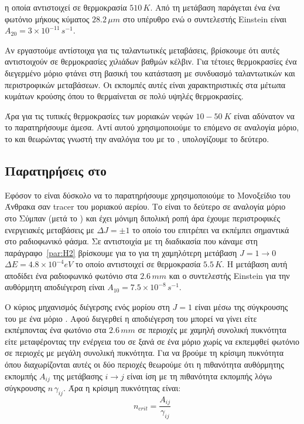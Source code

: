 \documentclass[a4paper,12pt]{memoir}
\begin{document}
η οποία αντιστοιχεί σε θερμοκρασία $510 \,K$. Από τη μετάβαση παράγεται ένα ένα φωτόνιο μήκους κύματος $28.2\, \mu m$ στο υπέρυθρο ενώ ο συντελεστής Einstein είναι $A_{20}=3\times 10^{-11} \, s^{-1}$.

Αν εργαστούμε αντίστοιχα για τις ταλαντωτικές μεταβάσεις, βρίσκουμε ότι αυτές αντιστοιχούν σε θερμοκρασίες χιλιάδων βαθμών κέλβιν. Για τέτοιες θερμοκρασίες ένα διεγερμένο μόριο  φτάνει στη βασική του κατάσταση με συνδυασμό ταλαντωτικών και περιστροφικών μεταβάσεων. Οι εκπομπές αυτές είναι χαρακτηριστικές στα μέτωπα κυμάτων κρούσης όπου το  θερμαίνεται σε πολύ υψηλές θερμοκρασίες.

Άρα για τις τυπικές θερμοκρασίες των μοριακών νεφών $10-50\ K$ είναι αδύνατον να το παρατηρήσουμε άμεσα. Αντί αυτού χρησιμοποιούμε το επόμενο σε αναλογία μόριο, το  και θεωρώντας γνωστή την αναλόγια του με το , υπολογίζουμε το δεύτερο. 

\subsection{Παρατηρήσεις στο  }
Εφόσον το  είναι δύσκολο να το παρατηρήσουμε χρησιμοποιούμε το Μονοξείδιο του Άνθρακα  σαν tracer  του μοριακού αερίου. Το  είναι το δεύτερο σε αναλογία μόριο στο Σύμπαν (μετά το ) και έχει μόνιμη διπολική ροπή άρα έχουμε περιστροφικές ενεργειακές μεταβάσεις με $\Delta J=\pm 1$ το οποίο του επιτρέπει να εκπέμπει σημαντικά στο ραδιοφωνικό φάσμα. 
Σε αντιστοιχία με τη διαδικασία που κάναμε στη παράγραφο~\ref{par:H2} βρίσκουμε για το  για τη χαμηλότερη μετάβαση $J=1\rightarrow 0$ $\Delta E=4.8\times 10^{-4} eV$ το οποίο αντιστοιχεί σε θερμοκρασία $5.5 \, K$. Η μετάβαση αυτή αποδίδει ένα ραδιοφωνικό φωτόνιο στα $2.6 \, mm$ και ο συντελεστής Einstein για την αυθόρμητη αποδιέγερση είναι $A_{10}=7.5\times 10^{-8} \, s^{-1}$.

Ο κύριος μηχανισμός διέγερσης ενός μορίου  στη $J=1$ είναι μέσω της σύγκρουσης του με ένα μόριο . Αφού διεγερθεί η αποδιέγερση του μπορεί να γίνει είτε εκπέμποντας ένα φωτόνιο στα $2.6 \, mm$ σε περιοχές με χαμηλή συνολική πυκνότητα είτε μεταφέροντας την ενέργεια του σε ξανά σε ένα μόριο  χωρίς να εκπεμφθεί φωτόνιο σε περιοχές με μεγάλη συνολική πυκνότητα. Για να βρούμε τη κρίσιμη πυκνότητα όπου διαχωρίζονται αυτές οι δύο περιοχές θεωρούμε ότι η πιθανότητα αυθόρμητης εκπομπής $A_{ij}$ της μετάβασης $i\rightarrow j$ είναι ίση με τη πιθανότητα εκπομπής λόγω σύγκρουσης $n \, \gamma _{ij}$. Άρα η κρίσιμη πυκνότητας είναι:
\begin{equation}
n_{crit}=\frac{A_{ij}}{\gamma _{ij}}
\end{equation} 
\end{document}
